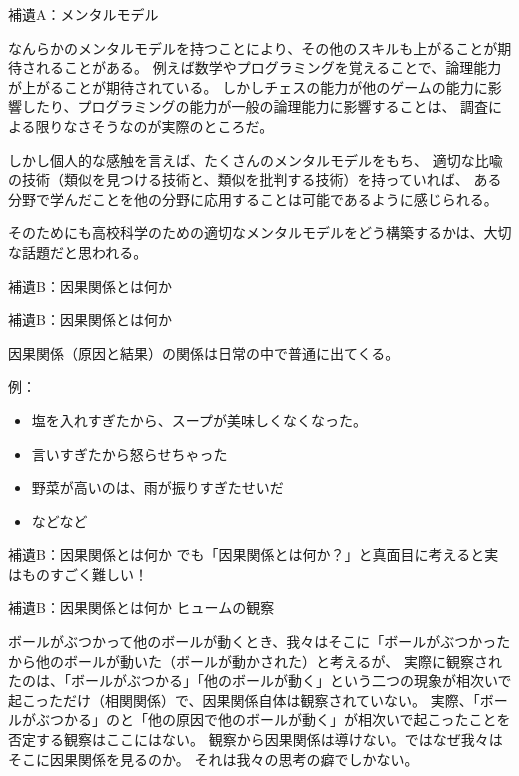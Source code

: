 \documentclass[12pt, unicode]{beamer}
\begin{document}
\begin{frame}{補遺A：メンタルモデル}

なんらかのメンタルモデルを持つことにより、その他のスキルも上がることが期待されることがある。
例えば数学やプログラミングを覚えることで、論理能力が上がることが期待されている。
しかしチェスの能力が他のゲームの能力に影響したり、プログラミングの能力が一般の論理能力に影響することは、
調査による限りなさそうなのが実際のところだ。

しかし個人的な感触を言えば、たくさんのメンタルモデルをもち、
適切な比喩の技術（類似を見つける技術と、類似を批判する技術）を持っていれば、
ある分野で学んだことを他の分野に応用することは可能であるように感じられる。

そのためにも高校科学のための適切なメンタルモデルをどう構築するかは、大切な話題だと思われる。

\end{frame}

\begin{frame}
{\LARGE 補遺B：因果関係とは何か}
\end{frame}

\begin{frame}{補遺B：因果関係とは何か}

因果関係（原因と結果）の関係は日常の中で普通に出てくる。

例：
\begin{itemize}
\item 塩を入れすぎたから、スープが美味しくなくなった。
\item 言いすぎたから怒らせちゃった
\item 野菜が高いのは、雨が振りすぎたせいだ
\item などなど
\end{itemize}

\end{frame}

\begin{frame}{補遺B：因果関係とは何か}
でも「因果関係とは何か？」と真面目に考えると実はものすごく難しい！
\end{frame}

\begin{frame}{補遺B：因果関係とは何か}
ヒュームの観察

ボールがぶつかって他のボールが動くとき、我々はそこに「ボールがぶつかったから他のボールが動いた（ボールが動かされた）と考えるが、
実際に観察されたのは、「ボールがぶつかる」「他のボールが動く」という二つの現象が相次いで起こっただけ（相関関係）で、因果関係自体は観察されていない。
実際、「ボールがぶつかる」のと「他の原因で他のボールが動く」が相次いで起こったことを否定する観察はここにはない。
観察から因果関係は導けない。ではなぜ我々はそこに因果関係を見るのか。
それは我々の思考の癖でしかない。
\end{frame}
\end{document}
